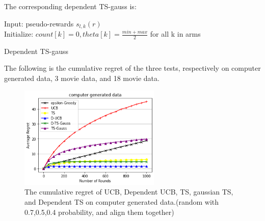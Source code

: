 \documentclass{article}
\begin{document}
\begin{homeworkProblem}
\begin{enumerate}
          The corresponding dependent TS-gauss is:\\
          \begin{algorithm}[H]
            \SetAlgoLined
            Input: pseudo-rewards $s_{l,k}(r)$\\
            Initialize: $count[k] = 0, theta[k] = \frac{min + max}{2} $ for all k in arms\\
            \caption{Dependent TS-gauss}
          \end{algorithm}
          The following is the cumulative regret of the three tests, respectively on computer generated data, 3 movie data, and 18 movie data.
          \begin{figure}[htp]
            \centering
            \includegraphics[width = 0.6\textwidth]{part1.png}
            \caption{The cumulative regret of UCB, Dependent UCB, TS, gaussian TS, and Dependent TS on computer generated data.(random with 0.7,0.5,0.4 probability, and align them together)}
            \label{fig1}
        \end{figure}
        \begin{figure}[htp]
            \centering

\end{figure}
\end{enumerate}
\end{homeworkProblem}
\end{document}
